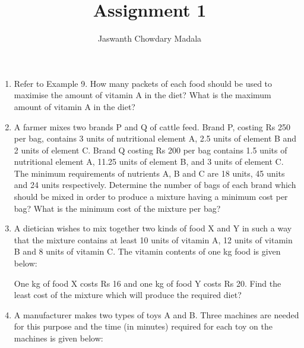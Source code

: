 \documentclass[journal,12pt,twocolumn]{IEEEtran}
\begin{document}
\vspace{3cm}


\title{Assignment 1}
\author{Jaswanth Chowdary Madala}





\maketitle

\newpage


\bigskip

\renewcommand{\thefigure}{\theenumi}
\renewcommand{\thetable}{\theenumi}



\begin{enumerate}
\item Refer to Example 9. How many packets of each food should be used to maximise the amount of vitamin A in the diet? What is the maximum amount of vitamin A in the diet?

\item A farmer mixes two brands P and Q of cattle feed. Brand P, costing Rs 250 per bag, contains 3 units of nutritional element A, 2.5 units of element B and 2 units of element C. Brand Q costing Rs 200 per bag contains 1.5 units of nutritional element A, 11.25 units of element B, and 3 units of element C. The minimum requirements of nutrients A, B and C are 18 units, 45 units and 24 units respectively. Determine the number of bags of each brand which should be mixed in order to produce a mixture having a minimum cost per bag? What is the minimum cost of the mixture per bag?

\item A dietician wishes to mix together two kinds of food X and Y in such a way that the mixture contains at least 10 units of vitamin A, 12 units of vitamin B and 8 units of vitamin C. The vitamin contents of one kg food is given below:

\begin{table}[h]
\centering

\caption{}
\end{table}

One kg of food X costs Rs 16 and one kg of food Y costs Rs 20. Find the least cost of the mixture which will produce the required diet?

\item A manufacturer makes two types of toys A and B. Three machines are needed
for this purpose and the time (in minutes) required for each toy on the machines is given below:


\end{enumerate}
\end{document}
